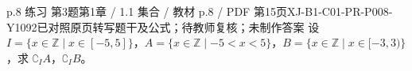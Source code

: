 \par\noindent\begin{minipage}{\linewidth}
\begin{bankitem}{p.8 练习 第3题}{第1章 / 1.1 集合 / 教材 p.8 / PDF 第15页}{XJ-B1-C01-PR-P008-Y1092}{已对照原页转写题干及公式；待教师复核；未制作答案}
设 $I=\{x\in\mathbb Z\mid x\in[-5,5]\}$，$A=\{x\in\mathbb Z\mid-5<x<5\}$，$B=\{x\in\mathbb Z\mid x\in[-3,3)\}$，求 $\complement_I A$，$\complement_I B$。
\end{bankitem}
\end{minipage}\par\medskip
